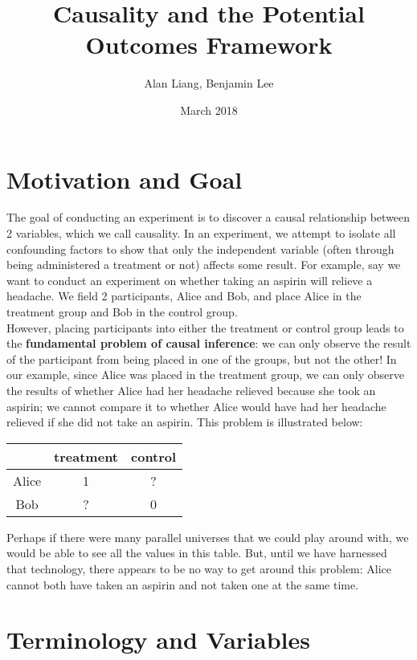 \documentclass{article}
\title{Causality and the Potential Outcomes Framework}
\author{Alan Liang, Benjamin Lee}
\date{March 2018}
\begin{document}
\maketitle

\section{Motivation and Goal}
The goal of conducting an experiment is to discover a causal relationship between 2 variables, which we call causality. 
In an experiment, we attempt to isolate all confounding factors to show that only the independent variable (often through being administered a treatment or not) affects some result. 
For example, say we want to conduct an experiment on whether taking an aspirin will relieve a headache.
We field 2 participants, Alice and Bob, and place Alice in the treatment group and Bob in the control group. 
\\
However, placing participants into either the treatment or control group leads to the \textbf{fundamental problem of causal inference}: we can only observe the result of the participant from being placed in one of the groups, but not the other!
In our example, since Alice was placed in the treatment group, we can only observe the results of whether Alice had her headache relieved because she took an aspirin; we cannot compare it to whether Alice would have had her headache relieved if she did not take an aspirin.
This problem is illustrated below:

\begin{center}
    \begin{tabular}{|c|c|c|}
        \hline
         & treatment & control \\
        \hline
        Alice & 1 & ? \\
        \hline
        Bob & ? & 0 \\
        \hline
    \end{tabular}
\end{center}

Perhaps if there were many parallel universes that we could play around with, we would be able to see all the values in this table. 
But, until we have harnessed that technology, there appears to be no way to get around this problem: Alice cannot both have taken an aspirin and not taken one at the same time. 
\section{Terminology and Variables}
\end{document}
